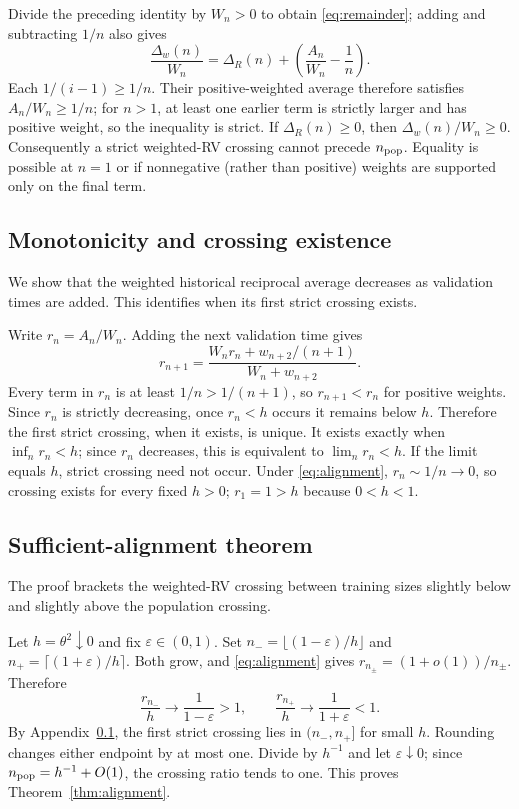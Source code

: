 \documentclass[11pt]{article}
\theoremstyle{definition}
\begin{document}
Divide the preceding identity by $W_n>0$ to obtain \eqref{eq:remainder}; adding and subtracting $1/n$ also gives
\[
\frac{\Delta_w(n)}{W_n}
=\Delta_R(n)+\left(\frac{A_n}{W_n}-\frac1n\right).
\]
 Each $1/(i-1)\ge1/n$. Their positive-weighted average therefore satisfies $A_n/W_n\ge1/n$; for $n>1$, at least one earlier term is strictly larger and has positive weight, so the inequality is strict. If $\Delta_R(n)\ge0$, then $\Delta_w(n)/W_n\ge0$. Consequently a strict weighted-RV crossing cannot precede $n_{\rm pop}$. Equality is possible at $n=1$ or if nonnegative (rather than positive) weights are supported only on the final term.

\subsection{Monotonicity and crossing existence}\label{app:monotonicity}
We show that the weighted historical reciprocal average decreases as validation times are added. This identifies when its first strict crossing exists.

Write $r_n=A_n/W_n$. Adding the next validation time gives
\[
r_{n+1}=\frac{W_nr_n+w_{n+2}/(n+1)}{W_n+w_{n+2}}.
\]
Every term in $r_n$ is at least $1/n>1/(n+1)$, so $r_{n+1}<r_n$ for positive weights. Since $r_n$ is strictly decreasing, once $r_n<h$ occurs it remains below $h$. Therefore the first strict crossing, when it exists, is unique. It exists exactly when $\inf_n r_n<h$; since $r_n$ decreases, this is equivalent to $\lim_n r_n<h$. If the limit equals $h$, strict crossing need not occur. Under \eqref{eq:alignment}, $r_n\sim1/n\to0$, so crossing exists for every fixed $h>0$; $r_1=1>h$ because $0<h<1$.

\subsection{Sufficient-alignment theorem}\label{app:alignment}
The proof brackets the weighted-RV crossing between training sizes slightly below and slightly above the population crossing.

Let $h=\theta^2\downarrow0$ and fix $\varepsilon\in(0,1)$. Set $n_-=\lfloor(1-\varepsilon)/h\rfloor$ and $n_+=\lceil(1+\varepsilon)/h\rceil$. Both grow, and \eqref{eq:alignment} gives $r_{n_\pm}=(1+o(1))/n_\pm$. Therefore
\[
\frac{r_{n_-}}h\to\frac1{1-\varepsilon}>1,\qquad
\frac{r_{n_+}}h\to\frac1{1+\varepsilon}<1.
\]
By Appendix~\ref{app:monotonicity}, the first strict crossing lies in $(n_-,n_+]$ for small $h$. Rounding changes either endpoint by at most one. Divide by $h^{-1}$ and let $\varepsilon\downarrow0$; since $n_{\rm pop}=h^{-1}+O(1)$, the crossing ratio tends to one. This proves Theorem~\ref{thm:alignment}.
\end{document}
